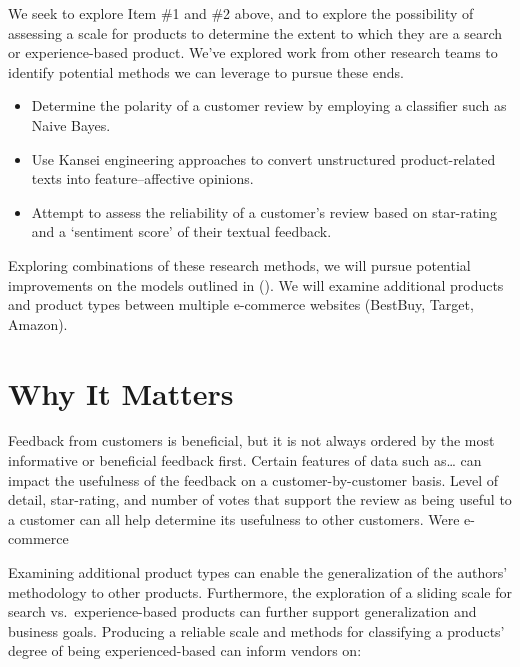 \documentclass[
  letterpaper,
  DIV=11,
  numbers=noendperiod]{scrreprt}
\begin{document}
We seek to explore Item \#1 and \#2 above, and to explore the
possibility of assessing a scale for products to determine the extent to
which they are a search or experience-based product. We've explored work
from other research teams to identify potential methods we can leverage
to pursue these ends.

\begin{itemize}
\item
  Determine the polarity of a customer review by employing a classifier
  such as Naive Bayes.
\item
  Use Kansei engineering approaches to convert unstructured
  product-related texts into feature--affective opinions.
\item
  Attempt to assess the reliability of a customer's review based on
  star-rating and a `sentiment score' of their textual feedback.
\end{itemize}

Exploring combinations of these research methods, we will pursue
potential improvements on the models outlined in
(). We will examine additional
products and product types between multiple e-commerce websites
(BestBuy, Target, Amazon).

\section{Why It Matters}\label{why-it-matters}

Feedback from customers is beneficial, but it is not always ordered by
the most informative or beneficial feedback first. Certain features of
data such as\ldots{} can impact the usefulness of the feedback on a
customer-by-customer basis. Level of detail, star-rating, and number of
votes that support the review as being useful to a customer can all help
determine its usefulness to other customers. Were e-commerce

Examining additional product types can enable the generalization of the
authors' methodology to other products. Furthermore, the exploration of
a sliding scale for search vs.~experience-based products can further
support generalization and business goals. Producing a reliable scale
and methods for classifying a products' degree of being
experienced-based can inform vendors on:
\end{document}
